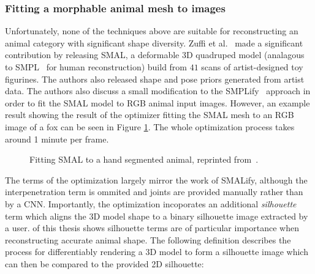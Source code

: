     \subsubsection{Fitting a morphable animal mesh to images}
    Unfortunately, none of the techniques above are suitable for reconstructing an animal category with significant shape diversity. Zuffi et al.~\cite{zuffi2017menagerie} made a significant contribution by releasing SMAL, a deformable 3D quadruped model (analagous to SMPL~\cite{loper15smpl} for human reconstruction) build from $41$ scans of artist-designed toy figurines. The authors also released shape and pose priors generated from artist data. The authors also discuss a small modification to the SMPLify~ approach in order to fit the SMAL model to RGB animal input images. However, an example result showing the result of the optimizer fitting the SMAL mesh to an RGB image of a fox can be seen in Figure \ref{fig:smalify}. The whole optimization process takes around 1 minute per frame. 

    \begin{figure}[t] %
        \caption{Fitting SMAL to a hand segmented animal, reprinted from~\cite{zuffi2017menagerie}.}
        \label{fig:smalify}
    \end{figure}

    The terms of the optimization largely mirror the work of SMALify, although the interpenetration term is ommited and joints are provided manually rather than by a CNN. Importantly, the optimization incoporates an additional \emph{silhouette} term which aligns the 3D model shape to a binary silhouette image extracted by a user.  of this thesis shows silhouette terms are of particular importance when reconstructing accurate animal shape. The following definition describes the process for differentiably rendering a 3D model to form a silhouette image which can then be compared to the provided 2D silhouette:

